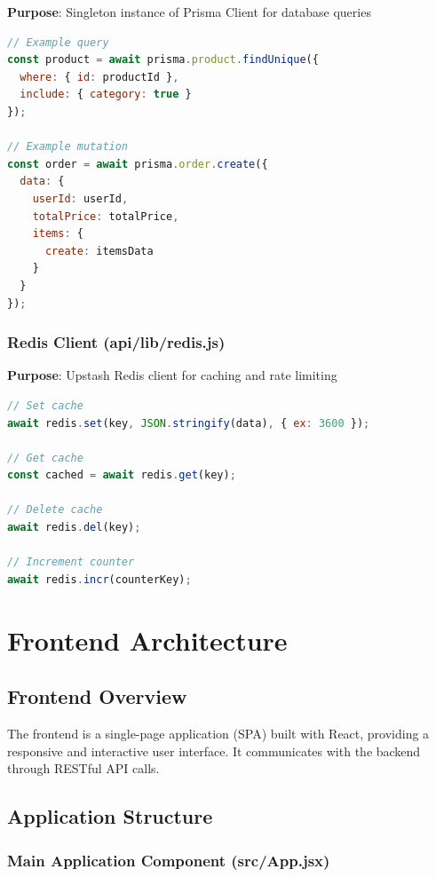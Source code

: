 \documentclass[12pt,a4paper]{report}
\begin{document}
\textbf{Purpose}: Singleton instance of Prisma Client for database queries

\begin{lstlisting}[language=javascript, caption=Prisma Client Usage]
// Example query
const product = await prisma.product.findUnique({
  where: { id: productId },
  include: { category: true }
});

// Example mutation
const order = await prisma.order.create({
  data: {
    userId: userId,
    totalPrice: totalPrice,
    items: {
      create: itemsData
    }
  }
});
\end{lstlisting}

\subsection{Redis Client (api/lib/redis.js)}

\textbf{Purpose}: Upstash Redis client for caching and rate limiting

\begin{lstlisting}[language=javascript, caption=Redis Client Usage]
// Set cache
await redis.set(key, JSON.stringify(data), { ex: 3600 });

// Get cache
const cached = await redis.get(key);

// Delete cache
await redis.del(key);

// Increment counter
await redis.incr(counterKey);
\end{lstlisting}

\newpage

\chapter{Frontend Architecture}

\section{Frontend Overview}

The frontend is a single-page application (SPA) built with React, providing a responsive and interactive user interface. It communicates with the backend through RESTful API calls.

\section{Application Structure}

\subsection{Main Application Component (src/App.jsx)}
\end{document}
